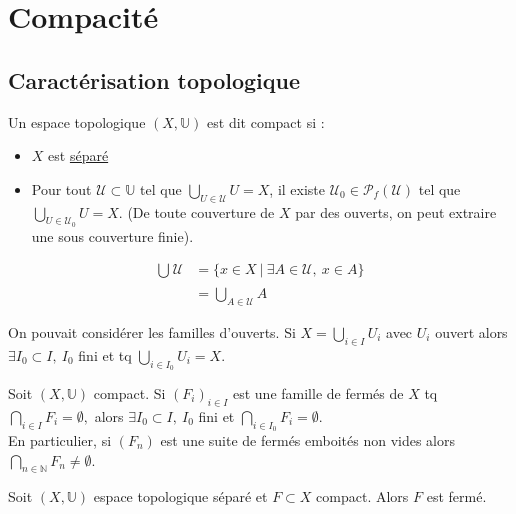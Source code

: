\newcommand\dif\partial
\newcommand\dd{\mathrm{d}}
\section{Compacité}
\subsection{Caractérisation topologique}
\begin{definition}
    Un espace topologique $(X,\mathbb{U})$ est dit compact si :
    \begin{itemize}
        \item $X$ est \underline{séparé}
        \item Pour tout $\mathcal{U}\subset \mathbb{U}$ tel que $\bigcup_{U \in \mathcal{U}}U=X$, il existe $\mathcal{U}_0 \in \mathcal{P}_f(\mathcal{U})$ 
 tel que $\bigcup\limits_{U \in \mathcal{U}_0} U =X$. (De toute couverture de $X$ par des ouverts, on peut extraire une sous couverture finie).
    \end{itemize}
\end{definition}
\begin{remarque}
    \begin{align*}
        \bigcup\limits_{} \mathcal{U}&=\{x\in X\ |\ \exists A\in \mathcal{U},\ x\in A\}\\
                                     &=\bigcup\limits_{A\in \mathcal{U}} A
     \end{align*}
\end{remarque}
\begin{remarque}
    On pouvait considérer les familles d'ouverts. Si $X=\bigcup\limits_{i\in I} U_i$ avec $U_i$ ouvert alors $\exists I_0\subset I,\ I_0 $ fini et tq $\bigcup\limits_{i\in I_0} U_i=X$.
\end{remarque}
\begin{remarque}
   Soit $(X,\mathbb{U})$ compact. Si $(F_i)_{i\in I}$ est une famille de fermés de $X$ tq $\bigcap\limits_{i\in I} F_i=\emptyset ,$ alors $\exists I_0\subset I,\ I_0$ fini et $\bigcap\limits_{i\in I_0} F_i=\emptyset $.\\
   En particulier, si $(F_n)$ est une suite de fermés emboités non vides alors $\bigcap\limits_{n\in \mathbb{N} } F_n\neq \emptyset .$
\end{remarque}
\begin{lemme}
    Soit $(X,\mathbb{U})$ espace topologique séparé et $F\subset X$ compact. Alors $F$ est fermé.
\end{lemme}
